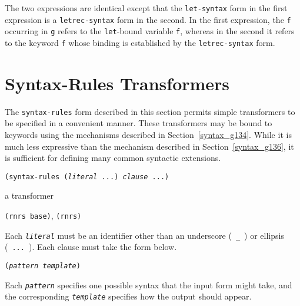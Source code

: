 The two expressions are identical except that the \texttt{let-syntax} form
in the first expression is a \texttt{letrec-syntax} form in the second.
In the first expression, the \texttt{f} occurring in \texttt{g} refers to
the \texttt{let}-bound variable \texttt{f}, whereas in the second it refers
to the keyword \texttt{f} whose binding is established by the
\texttt{letrec-syntax} form.



\section{\label{syntax_g135}\label{syntax_h2}Syntax-Rules Transformers\label{syntax_SECTSYNTAXRULES}}



The \texttt{syntax-rules} form described in this
section permits simple transformers to be specified in a
convenient manner.
These transformers may be bound to keywords using the mechanisms
described in Section \ref{syntax_g134}.
While it is much less expressive than the mechanism described in
Section \ref{syntax_g136}, it is sufficient for defining many common
syntactic extensions.

\begin{description}

\label{syntax_s14}\item[syntax] \texttt{(syntax-rules (\textit{literal} ...) \textit{clause} ...)}



\item[returns] a transformer


\item[libraries] \texttt{(rnrs base)}, \texttt{(rnrs)}
\end{description}


Each \label{syntax_s15}\texttt{\textit{literal}} must be an identifier other than
an underscore ( \texttt{\_{}} ) or ellipsis ( \texttt{...} ).
Each clause must take the form below.


\texttt{(\textit{pattern} \textit{template})}

Each \texttt{\textit{pattern}} specifies one possible syntax that the input
form might take, and the corresponding \texttt{\textit{template}} specifies
how the output should appear.


